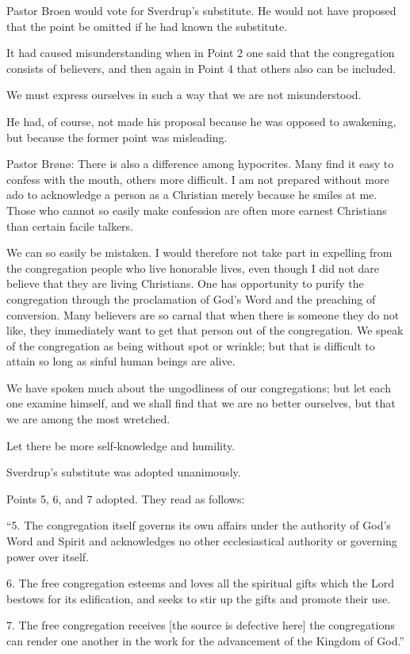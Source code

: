 Pastor Broen would vote for Sverdrup’s substitute. He would not have proposed that the point be omitted if he had known the substitute.

It had caused misunderstanding when in Point 2 one said that the congregation consists of believers, and then again in Point 4 that others also can be included.

We must express ourselves in such a way that we are not misunderstood.

He had, of course, not made his proposal because he was opposed to awakening, but because the former point was misleading.

Pastor Brønø: There is also a difference among hypocrites. Many find it easy to confess with the mouth, others more difficult. I am not prepared without more ado to acknowledge a person as a Christian merely because he smiles at me. Those who cannot so easily make confession are often more earnest Christians than certain facile talkers.

We can so easily be mistaken. I would therefore not take part in expelling from the congregation people who live honorable lives, even though I did not dare believe that they are living Christians. One has opportunity to purify the congregation through the proclamation of God’s Word and the preaching of conversion. Many believers are so carnal that when there is someone they do not like, they immediately want to get that person out of the congregation. We speak of the congregation as being without spot or wrinkle; but that is difficult to attain so long as sinful human beings are alive.

We have spoken much about the ungodliness of our congregations; but let each one examine himself, and we shall find that we are no better ourselves, but that we are among the most wretched.

Let there be more self-knowledge and humility.

Sverdrup’s substitute was adopted unanimously.

Points 5, 6, and 7 adopted. They read as follows:

“5. The congregation itself governs its own affairs under the authority of God’s Word and Spirit and acknowledges no other ecclesiastical authority or governing power over itself.

6. The free congregation esteems and loves all the spiritual gifts which the Lord bestows for its edification, and seeks to stir up the gifts and promote their use.

7. The free congregation receives
   [the source is defective here]
   the congregations can render one another in the work for the advancement of the Kingdom of God.”

